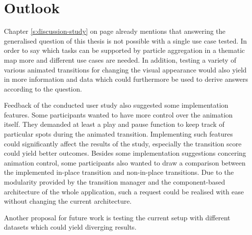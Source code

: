 \section{Outlook}
\label{s:outlook}
Chapter \ref{s:discussion-study} on page \pageref{s:discussion-study} already mentions that answering the generalised question of this thesis is not possible with a single use case tested. In order to say which tasks can be supported by particle aggregation in a thematic map more and different use cases are needed. In addition, testing a variety of various animated transitions for changing the visual appearance would also yield in more information and data which could furthermore be used to derive answers according to the question.

Feedback of the conducted user study also suggested some implementation features. Some participants wanted to have more control over the animation itself. They demanded at least a play and pause function to keep track of particular spots during the animated transition. Implementing such features could significantly affect the results of the study, especially the transition score could yield better outcomes. Besides some implementation suggestions concering animation control, some participants also wanted to draw a comparison between the implemented in-place transition and non-in-place transitions. Due to the modularity provided by the transition manager and the component-based architecture of the whole application, such a request could be realised with ease without changing the current architecture.

Another proposal for future work is testing the current setup with different datasets which could yield diverging results.








